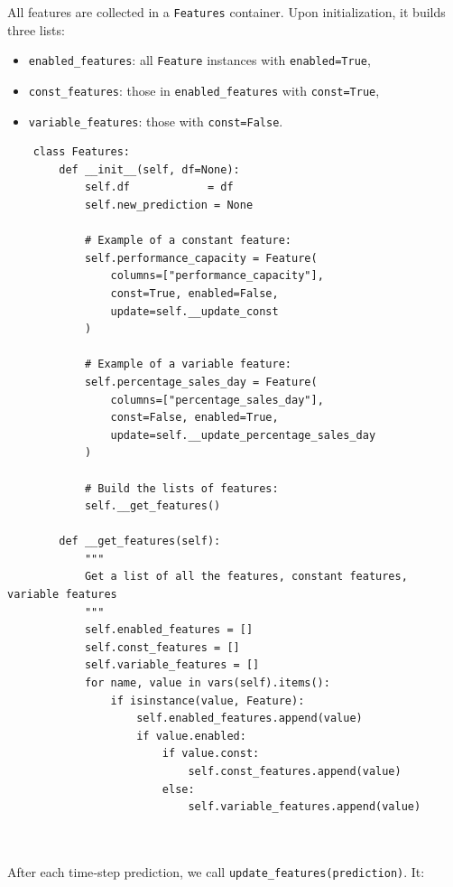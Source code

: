 \documentclass[a4paper,12pt]{report}  %
\begin{document}
All features are collected in a \texttt{Features} container. Upon initialization, it builds three lists:
\begin{itemize}
	\item \texttt{enabled\_features}: all \texttt{Feature} instances with \texttt{enabled=True},
	\item \texttt{const\_features}: those in \texttt{enabled\_features} with \texttt{const=True},
	\item \texttt{variable\_features}: those with \texttt{const=False}.
\end{itemize}

\begin{verbatim}
    class Features:
        def __init__(self, df=None):
            self.df            = df
            self.new_prediction = None

            # Example of a constant feature:
            self.performance_capacity = Feature(
                columns=["performance_capacity"],
                const=True, enabled=False,
                update=self.__update_const
            )

            # Example of a variable feature:
            self.percentage_sales_day = Feature(
                columns=["percentage_sales_day"],
                const=False, enabled=True,
                update=self.__update_percentage_sales_day
            )

            # Build the lists of features:
            self.__get_features()

        def __get_features(self):
            """
            Get a list of all the features, constant features, variable features
            """
            self.enabled_features = []
            self.const_features = []
            self.variable_features = []
            for name, value in vars(self).items():
                if isinstance(value, Feature):
                    self.enabled_features.append(value)
                    if value.enabled:
                        if value.const:
                            self.const_features.append(value)
                        else:
                            self.variable_features.append(value)



      \end{verbatim}

After each time‐step prediction, we call \texttt{update\_features(prediction)}. It:
\end{document}
